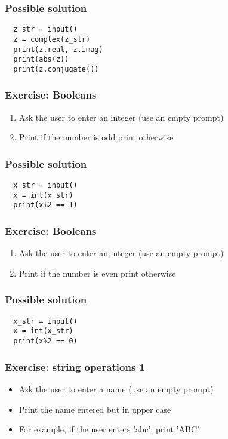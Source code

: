 \documentclass[14pt,compress]{beamer}
\begin{document}
\begin{frame}
\frametitle{Possible solution}
\begin{lstlisting}
  z_str = input()
  z = complex(z_str)
  print(z.real, z.imag)
  print(abs(z))
  print(z.conjugate())
\end{lstlisting}

\end{frame}

\begin{frame}[plain]
  \frametitle{Exercise: Booleans}
  \begin{enumerate}
  \item Ask the user to enter an integer (use an empty prompt)
  \item Print  if the number is odd print  otherwise
  \end{enumerate}
\end{frame}

\begin{frame}
\frametitle{Possible solution}
\begin{lstlisting}
  x_str = input()
  x = int(x_str)
  print(x%2 == 1)
\end{lstlisting}
\end{frame}

\begin{frame}[plain]
  \frametitle{Exercise: Booleans}
  \begin{enumerate}
  \item Ask the user to enter an integer (use an empty prompt)
  \item Print  if the number is even print  otherwise
  \end{enumerate}
\end{frame}

\begin{frame}
\frametitle{Possible solution}
\begin{lstlisting}
  x_str = input()
  x = int(x_str)
  print(x%2 == 0)
\end{lstlisting}
\end{frame}

\begin{frame}[plain]
  \frametitle{Exercise: string operations 1}
  \begin{itemize}
  \item Ask the user to enter a name (use an empty prompt)
  \item Print the name entered but in upper case
  \item For example, if the user enters 'abc', print 'ABC'
  \end{itemize}
\end{frame}
\end{document}
